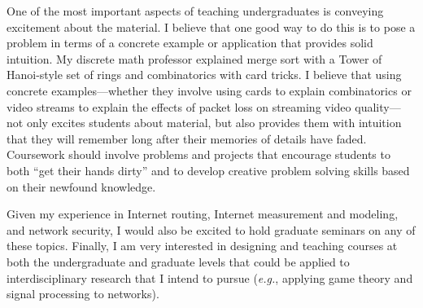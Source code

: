 \documentclass[11pt]{article}
\newcommand{\eg}{{\em e.g.}}
\begin{document}
One of the most important aspects of teaching undergraduates is
conveying excitement about the material.  I believe that one good way to
do this is to pose a problem in terms of a concrete example or application that
provides solid intuition.  My discrete math professor explained merge sort with
a Tower of Hanoi-style set of rings and combinatorics with card tricks.  I
believe that using concrete examples---whether they involve using cards to
explain combinatorics or video streams to explain the effects of packet loss on
streaming video quality---not only excites students about material, but also
provides them with intuition that they will remember long after their memories
of details have faded.  Coursework should involve problems and projects that
encourage students to both ``get their hands dirty'' and to develop creative
problem solving skills based on their newfound knowledge.  

Given my experience in Internet routing, Internet measurement and
modeling, and network security, I would also be excited to hold graduate
seminars on any of these topics.  Finally, I am very interested in
designing and teaching courses at both the undergraduate and graduate
levels that could be applied to interdisciplinary research that I intend
to pursue (\eg, applying game theory and signal processing to networks).
%
\end{document}

